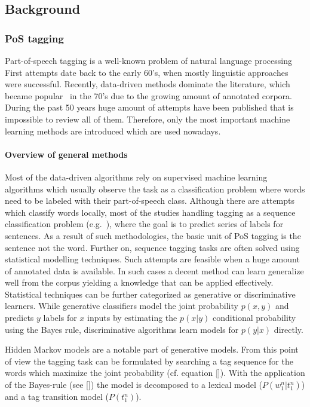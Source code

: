 \subsection{Background}

\subsubsection{PoS tagging}

Part-of-speech tagging is a well-known problem of natural language processing First attempts date back to the early 60’s, when mostly linguistic approaches~\cite{} were successful.
Recently, data-driven methods dominate the literature, which became popular~\cite{claws} in the 70’s due to the growing amount of annotated corpora.
During the past 50 years huge amount of attempts have been published that is impossible to review all of them.
Therefore, only the most important machine learning methods are introduced which are used nowadays. 

\paragraph{Overview of general methods}

Most of the data-driven algorithms rely on supervised machine learning algorithms which usually observe the task as a classification problem where words need to be labeled with their part-of-speech class.
Although there are attempts~\cite{} which classify words locally, most of the studies handling tagging as a sequence classification problem (e.g.~\cite{}), where the goal is to predict series of labels for sentences.
As a result of such methodologies, the basic unit of PoS tagging is the sentence not the word.
Further on, sequence tagging tasks are often solved using statistical modelling techniques.
Such attempts are feasible when a huge amount of annotated data is available.
In such cases a decent method can learn generalize well from the corpus yielding a knowledge that can be applied effectively.
Statistical techniques can be further categorized as generative or discriminative learners.
While generative classifiers model the joint probability $p(x,y)$ and predicts $y$ labels for $x$ inputs by estimating the $p(x|y)$ conditional probability using the Bayes rule, discriminative algorithms learn models for $p(y|x)$ directly.

Hidden Markov models are a notable part of generative models.
From this point of view the tagging task can be formulated by searching a tag sequence for the words which maximize the joint probability (cf. equation \eqref{}).
With the application of the Bayes-rule (see \eqref{}) the model is decomposed to a lexical model ($P(w_1^n|t_1^n)$) and a tag transition model ($P(t_1^n)$).

